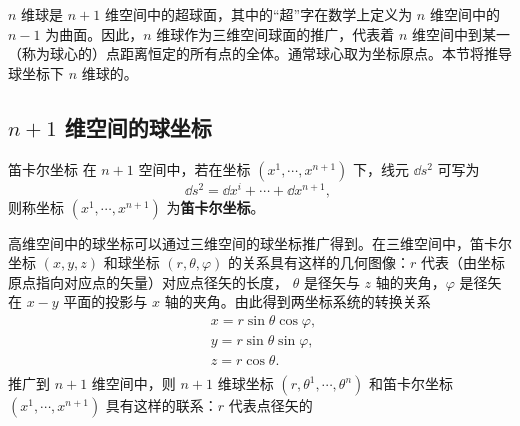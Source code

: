 
$n$ 维球是 $n+1$ 维空间中的超球面，其中的“超”字在数学上定义为 $n$ 维空间中的 $n-1$ 为曲面。因此，$n$ 维球作为三维空间球面的推广，代表着 $n$ 维空间中到某一（称为球心的）点距离恒定的所有点的全体。通常球心取为坐标原点。本节将推导球坐标下 $n$ 维球的。

\subsection{$n+1$ 维空间的球坐标}
\begin{definition}{笛卡尔坐标}
在 $n+1$ 空间中，若在坐标 $(x^1,\cdots,x^{n+1})$ 下，线元 $\dd s^2$ 可写为
\begin{equation}
\dd s^2=\dd x^i+\cdots+\dd x^{n+1},~
\end{equation}
 则称坐标 $(x^1,\cdots,x^{n+1})$ 为\textbf{笛卡尔坐标}。
\end{definition}

高维空间中的球坐标可以通过三维空间的球坐标推广得到。在三维空间中，笛卡尔坐标 $(x,y,z)$ 和球坐标 $(r,\theta,\varphi)$ 的关系具有这样的几何图像：$r$ 代表（由坐标原点指向对应点的矢量）对应点径矢的长度， $\theta$ 是径矢与 $z$ 轴的夹角，$\varphi$ 是径矢在 $x-y$ 平面的投影与 $x$ 轴的夹角。由此得到两坐标系统的转换关系
\begin{equation}
\begin{aligned}
&x=r\sin\theta\cos\varphi,\\
&y=r\sin\theta\sin\varphi,\\
&z=r\cos\theta.\\
\end{aligned}~
\end{equation}
推广到 $n+1$ 维空间中，则 $n+1$ 维球坐标 $(r,\theta^1,\cdots,\theta^{n})$ 和笛卡尔坐标 $(x^1,\cdots,x^{n+1})$ 具有这样的联系：$r$ 代表点径矢的



















